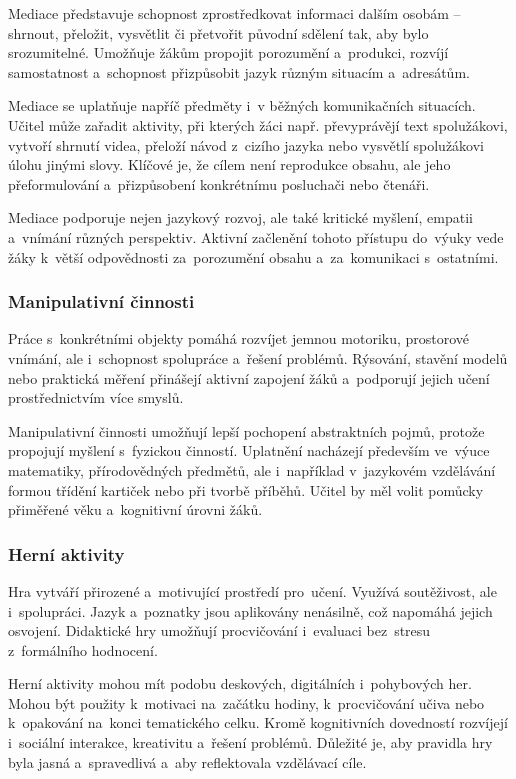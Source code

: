 \documentclass[male,czech,api_bc]{kitheses}
\begin{document}
Mediace představuje schopnost zprostředkovat informaci dalším osobám – shrnout, přeložit, vysvětlit či přetvořit původní sdělení tak, aby bylo srozumitelné. Umožňuje žákům propojit porozumění a~produkci, rozvíjí samostatnost a~schopnost přizpůsobit jazyk různým situacím a~adresátům.

Mediace se uplatňuje napříč předměty i~v běžných komunikačních situacích. Učitel může zařadit aktivity, při kterých žáci např. převyprávějí text spolužákovi, vytvoří shrnutí videa, přeloží návod z~cizího jazyka nebo vysvětlí spolužákovi úlohu jinými slovy. Klíčové je, že cílem není reprodukce obsahu, ale jeho přeformulování a~přizpůsobení konkrétnímu posluchači nebo čtenáři.

Mediace podporuje nejen jazykový rozvoj, ale také kritické myšlení, empatii a~vnímání různých perspektiv. Aktivní začlenění tohoto přístupu do~výuky vede žáky k~větší odpovědnosti za~porozumění obsahu a~za~komunikaci s~ostatními.

\subsubsection{Manipulativní činnosti}

Práce s~konkrétními objekty pomáhá rozvíjet jemnou motoriku, prostorové vnímání, ale i~schopnost spolupráce a~řešení problémů. Rýsování, stavění modelů nebo praktická měření přinášejí aktivní zapojení žáků a~podporují jejich učení prostřednictvím více smyslů.

Manipulativní činnosti umožňují lepší pochopení abstraktních pojmů, protože propojují myšlení s~fyzickou činností. Uplatnění nacházejí především ve~výuce matematiky, přírodovědných předmětů, ale i~například v~jazykovém vzdělávání formou třídění kartiček nebo při tvorbě příběhů. Učitel by měl volit pomůcky přiměřené věku a~kognitivní úrovni žáků.

\subsubsection{Herní aktivity}

Hra vytváří přirozené a~motivující prostředí pro~učení. Využívá soutěživost, ale i~spolupráci. Jazyk a~poznatky jsou aplikovány nenásilně, což napomáhá jejich osvojení. Didaktické hry umožňují procvičování i~evaluaci bez~stresu z~formálního hodnocení.

Herní aktivity mohou mít podobu deskových, digitálních i~pohybových her. Mohou být použity k~motivaci na~začátku hodiny, k~procvičování učiva nebo k~opakování na~konci tematického celku. Kromě kognitivních dovedností rozvíjejí i~sociální interakce, kreativitu a~řešení problémů. Důležité je, aby pravidla hry byla jasná a~spravedlivá a~aby reflektovala vzdělávací cíle.
\end{document}
